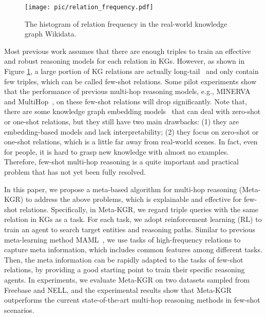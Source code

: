 \documentclass[11pt,a4paper]{article}
\begin{document}
\begin{figure}[t]
\centering
\setlength{\abovecaptionskip}{2pt}
\setlength{\belowcaptionskip}{0pt}
\texttt{[image: pic/relation\_frequency.pdf]}
\caption{The histogram of relation frequency in the real-world knowledge graph Wikidata.}
\label{relation_frequency}
\end{figure}

Most previous work assumes that there are enough triples to train an effective and robust reasoning models for each relation in KGs. However, as shown in Figure \ref{relation_frequency}, a large portion of KG relations are actually long-tail~\cite{one-shot,Fewrel} and only contain few triples, which can be called few-shot relations. Some pilot experiments show that the performance of previous multi-hop reasoning models, e.g., MINERVA~\cite{MINERVA} and MultiHop~\cite{MultiHop}, on these few-shot relations will drop significantly. Note that, there are some knowledge graph embedding models~\cite{one-shot, shi2018open, DKRL} that can deal with zero-shot or one-shot relations, but they still have two main drawbacks: (1) they are embedding-based models and lack interpretability; (2) they focus on zero-shot or one-shot relations, which is a little far away from real-world scenes. In fact, even for people, it is hard to grasp new knowledge with almost no examples. Therefore, few-shot multi-hop reasoning is a quite important and practical problem that has not yet been fully resolved.

In this paper, we propose a meta-based algorithm for multi-hop reasoning (Meta-KGR) to address the above problems, which is explainable and effective for few-shot relations. Specifically, in Meta-KGR, we regard triple queries with the same relation  in KGs as a task. For each task, we adopt reinforcement learning (RL) to train an agent to search target entities and reasoning paths. Similar to previous meta-learning method MAML~\cite{MAML}, we use tasks of high-frequency relations to capture meta information, which includes common features among different tasks. Then, the meta information can be rapidly adapted to the tasks of few-shot relations, by providing a good starting point to train their specific reasoning agents. In experiments, we evaluate Meta-KGR on two datasets sampled from Freebase and NELL, and the experimental results show that Meta-KGR outperforms  the current state-of-the-art multi-hop reasoning methods in few-shot scenarios.  
\end{document}
